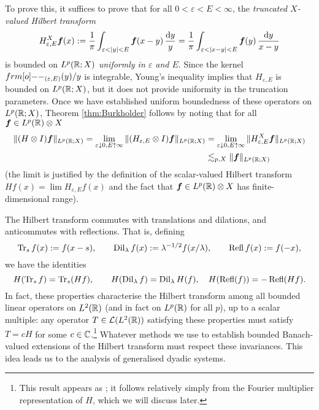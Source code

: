 To prove this, it suffices to prove that for all $0 < \varepsilon < E < \infty$, the \emph{truncated $X$-valued Hilbert transform}
\begin{equation*}
  H_{\varepsilon,E}^{X} \bm{f}(x) :=  \frac{1}{\pi} \int_{\varepsilon < |y| < E} \bm{f}(x-y) \, \frac{\mathrm{d} y}{y} = \frac{1}{\pi} \int_{\varepsilon < |x-y| < E} \bm{f}(y) \, \frac{\mathrm{d} y}{x-y}
\end{equation*}
is bounded on $L^p(\mathbb{R};X)$ \emph{uniformly in $\varepsilon$ and $E$}.
Since the kernel $\1_{(\varepsilon,E)}(y)/y$ is integrable, Young's inequality implies that $H_{\varepsilon,E}$ is bounded on $L^p(\mathbb{R};X)$, but it does not provide uniformity in the truncation parameters.
Once we have established uniform boundedness of these operators on $L^p(\mathbb{R};X)$, Theorem \ref{thm:Burkholder} follows by noting that for all $\bm{f} \in L^p(\mathbb{R}) \otimes X$
\begin{equation*}
  \begin{aligned}
    \|(H \otimes I)\bm{f}\|_{L^p(\mathbb{R};X)}
    = \lim_{\varepsilon \downarrow 0, E \uparrow \infty} \|(H_{\varepsilon,E} \otimes I)\bm{f}\|_{L^p(\mathbb{R};X)}
    &= \lim_{\varepsilon \downarrow 0, E \uparrow \infty} \|H_{\varepsilon,E}^{X}\bm{f}\|_{L^p(\mathbb{R};X)} \\
    &\lesssim_{p,X} \|\bm{f}\|_{L^p(\mathbb{R};X)}
  \end{aligned}
\end{equation*}
(the limit is justified by the definition of the scalar-valued Hilbert transform $Hf(x) = \lim H_{\varepsilon, E}f(x)$ and the fact that $\bm{f} \in L^p(\mathbb{R}) \otimes X$ has finite-dimensional range).

The Hilbert transform commutes with translations and dilations, and anticommutes with reflections.
That is, defining
\begin{equation}\label{eq:symmetries}
  \operatorname{Tr}_{s} f (x) := f(x - s), \qquad \operatorname{Dil}_{\lambda} f(x) := \lambda^{-1/2}f(x/\lambda), \qquad   \operatorname{Refl} f(x) := f(-x),
\end{equation}
we have the identities
\begin{equation*}
  H(\operatorname{Tr}_{s} f) = \operatorname{Tr}_{s} (Hf), \qquad H(\operatorname{Dil}_{\lambda} f) = \operatorname{Dil}_{\lambda} H(f), \quad H(\operatorname{Refl}(f)) = -\operatorname{Refl}(Hf).
\end{equation*}
In fact, these properties characterise the Hilbert transform among all bounded linear operators on $L^2(\mathbb{R})$ (and in fact on $L^p(\mathbb{R})$ for all $p$), up to a scalar multiple: any operator $T \in \mathcal{L}(L^2(\mathbb{R}))$ satisfying these properties must satisfy $T = cH$ for some $c \in \mathbb{C}$.\footnote{This result appears as \cite[Exercise 5.1.11]{grafakos}; it follows relatively simply from the Fourier multiplier representation of $H$, which we will discuss later.}
Whatever methods we use to establish bounded Banach-valued extensions of the Hilbert transform must respect these invariances.
This idea leads us to the analysis of generalised dyadic systems.

